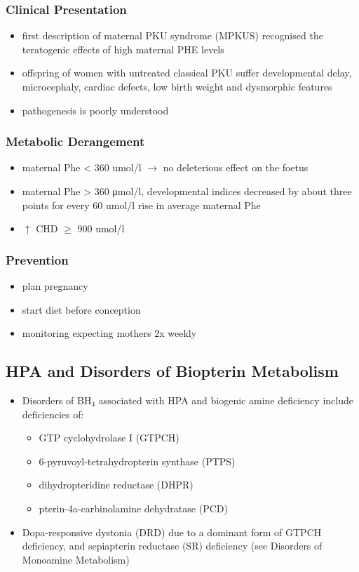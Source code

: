 \documentclass{scrartcl}
\begin{document}
\subsubsection{Clinical Presentation}
\label{sec:orgf7a7c2a}
\begin{itemize}
\item first description of maternal PKU syndrome (MPKUS) recognised the
teratogenic effects of high maternal PHE levels
\item offspring of women with untreated classical PKU suffer developmental
delay, microcephaly, cardiac defects, low birth weight and
dysmorphic features
\item pathogenesis is poorly understood
\end{itemize}
\subsubsection{Metabolic Derangement}
\label{sec:org788affd}
\begin{itemize}
\item maternal Phe \textless{} 360 umol/l \(\to\) no deleterious effect on the foetus
\item maternal Phe \textgreater{} 360 μmol/l, developmental indices decreased by
about three points for every 60 umol/l rise in average maternal Phe
\item \(\uparrow\) CHD \(\ge\) 900 umol/l
\end{itemize}
\subsubsection{Prevention}
\label{sec:org174d108}
\begin{itemize}
\item plan pregnancy
\item start diet before conception
\item monitoring expecting mothers 2x weekly
\end{itemize}

\subsection{HPA and Disorders of Biopterin Metabolism}
\label{sec:org6e138f3}
\begin{itemize}
\item Disorders of BH\(_{\text{4}}\) associated with HPA and biogenic amine deficiency
include deficiencies of:
\begin{itemize}
\item GTP cyclohydrolase I (GTPCH)
\item 6-pyruvoyl-tetrahydropterin synthase (PTPS)
\item dihydropteridine reductase (DHPR)
\item pterin-4a-carbinolamine dehydratase (PCD)
\end{itemize}
\item Dopa-responsive dystonia (DRD) due to a dominant form of GTPCH
deficiency, and sepiapterin reductase (SR) deficiency (see Disorders of Monoamine Metabolism)
\end{itemize}
\end{document}
